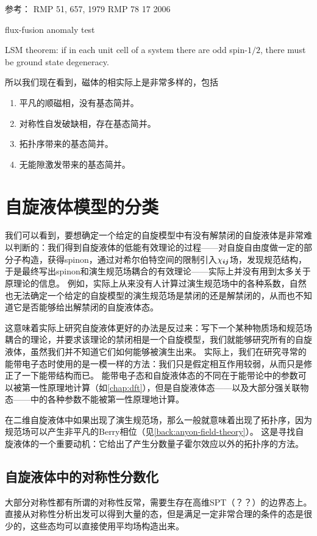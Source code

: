 参考： 
RMP 51, 657, 1979
RMP 78 17 2006

flux-fusion anomaly test

LSM theorem: if in each unit cell of a system there are odd spin-$1/2$, there must be ground state degeneracy.

所以我们现在看到，磁体的相实际上是非常多样的，包括
\begin{enumerate}
    \item 平凡的顺磁相，没有基态简并。
    \item 对称性自发破缺相，存在基态简并。
    \item 拓扑序带来的基态简并。
    \item 无能隙激发带来的基态简并。
\end{enumerate}

\section{自旋液体模型的分类}

我们可以看到，要想确定一个给定的自旋模型中有没有解禁闭的自旋液体是非常难以判断的：我们得到自旋液体的低能有效理论的过程——对自旋自由度做一定的部分子构造，获得spinon，通过对希尔伯特空间的限制引入$\chi_{\vb*{i} \vb*{j}}$场，发现规范结构，于是最终写出spinon和演生规范场耦合的有效理论——实际上并没有用到太多关于原理论的信息。
例如，实际上从来没有人计算过演生规范场中的各种系数，自然也无法确定一个给定的自旋模型的演生规范场是禁闭的还是解禁闭的，从而也不知道它是否能够给出解禁闭的自旋液体态。

这意味着实际上研究自旋液体更好的办法是反过来：写下一个某种物质场和规范场耦合的理论，并要求该理论的禁闭相是一个自旋模型，我们就能够研究所有的自旋液体，虽然我们并不知道它们如何能够被演生出来。
实际上，我们在研究寻常的能带电子态时使用的是一模一样的方法：我们只是假定相互作用较弱，从而只是修正了一下能带结构而已。
能带电子态和自旋液体态的不同在于能带论中的参数可以被第一性原理地计算（如\autoref{chap:dft}），但是自旋液体态——以及大部分强关联物态——中的各种参数不能被第一性原理地计算。

在二维自旋液体中如果出现了演生规范场，那么一般就意味着出现了拓扑序，因为规范场可以产生非平凡的Berry相位（见\autoref{back:anyon-field-theory}）。
这是寻找自旋液体的一个重要动机：它给出了产生分数量子霍尔效应以外的拓扑序的方法。

\subsection{自旋液体中的对称性分数化}

大部分对称性都有所谓的对称性反常，需要生存在高维SPT（？？）的边界态上。
直接从对称性分析出发可以得到大量的态，但是满足一定非常合理的条件的态是很少的，这些态均可以直接使用平均场构造出来。


